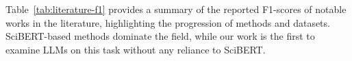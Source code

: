 Table~\ref{tab:literature-f1} provides a summary of the reported F1-scores of notable works in the literature, highlighting the progression of methods and datasets. SciBERT-based methods dominate the field, while our work is the first to examine LLMs on this task without any reliance to SciBERT.

